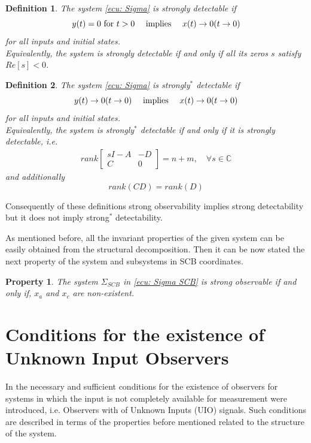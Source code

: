 \documentclass[11pt,letterpaper,twoside,openright]{report}
\newtheorem{definition}{Definition}[chapter]
\newtheorem{property}{Property}[chapter]
\begin{document}
\begin{definition}
	The system \eqref{ecu: Sigma} is strongly detectable if 
	\begin{equation}
		y(t)=0 \textup{ for } t>0 \quad \textup{ implies }  \quad  x(t) \rightarrow 0 (t \rightarrow 0)
	\end{equation}
	for all inputs and initial states. \\
	Equivalently, the system is strongly detectable if and only if all its zeros $s$ satisfy $Re[s] < 0$.
\end{definition}
\newpage
\begin{definition}\label{def: Strong Det*}
	The system \eqref{ecu: Sigma} is strongly$^*$ detectable if 
	\begin{equation}
		y(t)\rightarrow 0 (t \rightarrow 0)  \quad  \textup{ implies }  \quad  x(t) \rightarrow 0 (t \rightarrow 0)
	\end{equation}
	for all inputs and initial states. \\
	Equivalently, the system is strongly$^*$ detectable if and only if it is strongly detectable, i.e.
	\begin{equation}\label{ecu: Fase minima}
		\begin{split}
			rank
			\begin{bmatrix}
				sI-A & -D\\
				C & 0	
			\end{bmatrix}=n+m, \quad \forall s\in \mathbb{C}
		\end{split}
	\end{equation}
	 and additionally
	\begin{equation}\label{ecu: Cond rel deg 1}
			rank(CD) = rank(D)
	\end{equation} 
\end{definition}

Consequently of these definitions strong observability implies strong detectability but it does not imply strong$^*$ detectability.

As mentioned before, all the invariant properties of the given system can be easily obtained from the structural decomposition. Then it can be now stated the next property of the system and subsystems in SCB coordinates.

\begin{property}
	The system $\Sigma_{SCB}$ in \eqref{ecu: Sigma SCB} is strong observable if and only if, $x_a$ and $x_c$ are non-existent.
\end{property}

\section{Conditions for the existence of Unknown Input Observers}
In \cite{Hautus1983}\cite{Trentelman2001} the necessary and sufficient conditions for the existence of observers for systems in which the input is not completely available for measurement were introduced, i.e. Observers with of Unknown Inputs (UIO) signals. Such conditions are described in terms of the properties before mentioned related to the structure of the system. 
\end{document}
